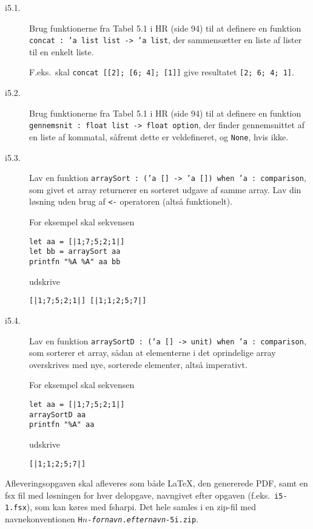 \documentclass[a4paper]{article}
\begin{document}
\begin{description}

\item[i5.1.] Brug funktionerne fra Tabel 5.1 i HR (side 94) til at
  definere en funktion \texttt{concat : 'a list list -> 'a list}, der
  sammensætter en liste af lister til en enkelt liste.

F.eks.\ skal \texttt{concat [[2]; [6; 4]; [1]]} give resultatet
\texttt{[2; 6; 4; 1]}.

\item[i5.2.] Brug funktionerne fra Tabel 5.1 i HR (side 94) til at
  definere en funktion \texttt{gennemsnit : float list -> float
    option}, der finder gennemsnittet af en liste af kommatal, såfremt
  dette er veldefineret, og \texttt{None}, hvis ikke.

\item[i5.3.] Lav en funktion \texttt{arraySort : ('a [] -> 'a []) when
  'a : comparison}, som givet et array returnerer en sorteret udgave
  af samme array.  Lav din løsning uden brug af \texttt{<-} operatoren
  (altså funktionelt).

  For eksempel skal sekvensen

\begin{verbatim}
let aa = [|1;7;5;2;1|]
let bb = arraySort aa
printfn "%A %A" aa bb
\end{verbatim}

udskrive

\begin{verbatim}
[|1;7;5;2;1|] [|1;1;2;5;7|]
\end{verbatim}

\item[i5.4.] Lav en funktion \texttt{arraySortD : ('a [] -> unit) when
  'a : comparison}, som sorterer et array, sådan at elementerne i det
  oprindelige array overskrives med nye, sorterede elementer, altså
  imperativt.

  For eksempel skal sekvensen

\begin{verbatim}
let aa = [|1;7;5;2;1|]
arraySortD aa
printfn "%A" aa
\end{verbatim}

udskrive

\begin{verbatim}
[|1;1;2;5;7|]
\end{verbatim}


\end{description}

\noindent
Afleveringsopgaven skal afleveres som både \LaTeX, den genererede PDF,
samt en fsx fil med løsningen for hver delopgave, navngivet efter
opgaven (f.eks.\ \texttt{i5-1.fsx}), som kan køres med fsharpi.  Det
hele samles i en zip-fil med navnekonventionen
\texttt{H$n$-\emph{fornavn}.\emph{efternavn}-5i.zip}.
\end{document}
